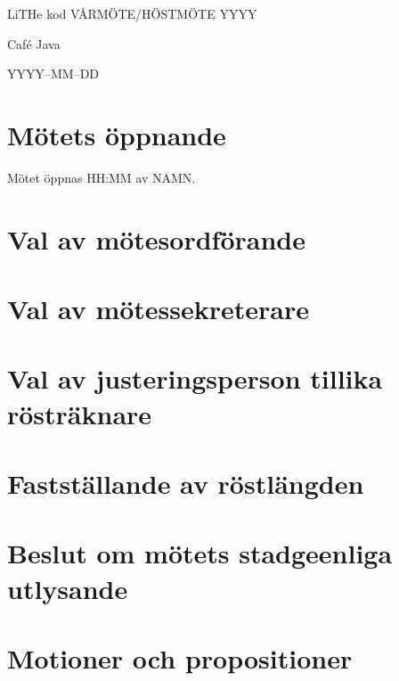 \documentclass[a4paper]{article}
\begin{document}
\pagestyle{fancy}

\setlength{\headheight}{50pt}

\begin{center}
{\huge LiTHe kod VÅRMÖTE/HÖSTMÖTE YYYY}\par
\vspace{0.5em}
{\Large Caf\'e Java}\par
{YYYY--MM--DD}
\vspace{1.5em}
\end{center}

\section{Mötets öppnande}

Mötet öppnas HH:MM av NAMN.

\section{Val av mötesordförande}

\section{Val av mötessekreterare}

\section{Val av justeringsperson tillika rösträknare}

\section{Fastställande av röstlängden}

\section{Beslut om mötets stadgeenliga utlysande}


\section{Motioner och propositioner}
\end{document}
